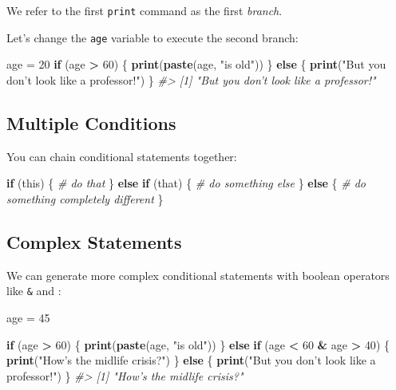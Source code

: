 \documentclass[]{book}
\newenvironment{Shaded}{\begin{snugshade}}{\end{snugshade}}
\newcommand{\KeywordTok}[1]{\textcolor[rgb]{0.13,0.29,0.53}{\textbf{#1}}}
\newcommand{\DecValTok}[1]{\textcolor[rgb]{0.00,0.00,0.81}{#1}}
\newcommand{\StringTok}[1]{\textcolor[rgb]{0.31,0.60,0.02}{#1}}
\newcommand{\CommentTok}[1]{\textcolor[rgb]{0.56,0.35,0.01}{\textit{#1}}}
\newcommand{\ControlFlowTok}[1]{\textcolor[rgb]{0.13,0.29,0.53}{\textbf{#1}}}
\newcommand{\OperatorTok}[1]{\textcolor[rgb]{0.81,0.36,0.00}{\textbf{#1}}}
\newcommand{\NormalTok}[1]{#1}
\begin{document}
We refer to the first \texttt{print} command as the first \emph{branch}.

Let's change the \texttt{age} variable to execute the second branch:

\begin{Shaded}
\begin{Highlighting}[]
\NormalTok{age =}\StringTok{ }\DecValTok{20}
\ControlFlowTok{if}\NormalTok{ (age }\OperatorTok{>}\StringTok{ }\DecValTok{60}\NormalTok{) \{}
    \KeywordTok{print}\NormalTok{(}\KeywordTok{paste}\NormalTok{(age, }\StringTok{"is old"}\NormalTok{))}
\NormalTok{\} }\ControlFlowTok{else}\NormalTok{ \{}
    \KeywordTok{print}\NormalTok{(}\StringTok{"But you don't look like a professor!"}\NormalTok{)}
\NormalTok{\}}
\CommentTok{#> [1] "But you don't look like a professor!"}
\end{Highlighting}
\end{Shaded}

\subsection{Multiple Conditions}\label{multiple-conditions}

You can chain conditional statements together:

\begin{Shaded}
\begin{Highlighting}[]
\ControlFlowTok{if}\NormalTok{ (this) \{}
  \CommentTok{# do that}
\NormalTok{\} }\ControlFlowTok{else} \ControlFlowTok{if}\NormalTok{ (that) \{}
  \CommentTok{# do something else}
\NormalTok{\} }\ControlFlowTok{else}\NormalTok{ \{}
  \CommentTok{# do something completely different}
\NormalTok{\}}
\end{Highlighting}
\end{Shaded}

\subsection{Complex Statements}\label{complex-statements}

We can generate more complex conditional statements with boolean
operators like \texttt{\&} and \texttt{\textbar{}}:

\begin{Shaded}
\begin{Highlighting}[]
\NormalTok{age =}\StringTok{ }\DecValTok{45} 

\ControlFlowTok{if}\NormalTok{ (age }\OperatorTok{>}\StringTok{ }\DecValTok{60}\NormalTok{) \{}
    \KeywordTok{print}\NormalTok{(}\KeywordTok{paste}\NormalTok{(age, }\StringTok{"is old"}\NormalTok{))}
\NormalTok{\} }\ControlFlowTok{else} \ControlFlowTok{if}\NormalTok{ (age }\OperatorTok{<}\StringTok{ }\DecValTok{60} \OperatorTok{&}\StringTok{ }\NormalTok{age }\OperatorTok{>}\StringTok{ }\DecValTok{40}\NormalTok{) \{}
    \KeywordTok{print}\NormalTok{(}\StringTok{"How's the midlife crisis?"}\NormalTok{)}
\NormalTok{\} }\ControlFlowTok{else}\NormalTok{ \{}
    \KeywordTok{print}\NormalTok{(}\StringTok{"But you don't look like a professor!"}\NormalTok{)}
\NormalTok{\}}
\CommentTok{#> [1] "How's the midlife crisis?"}
\end{Highlighting}
\end{Shaded}
\end{document}
